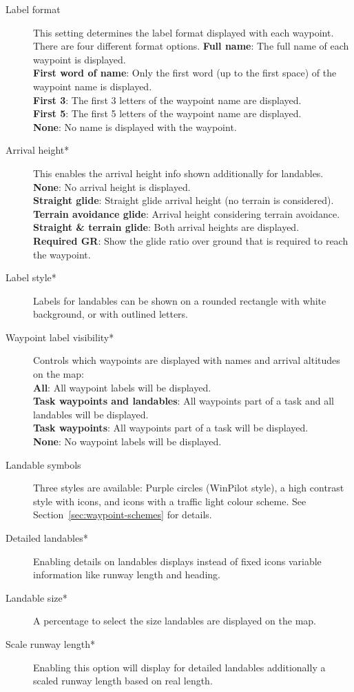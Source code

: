\begin{description}
\item[Label format]  This setting \label{conf:labels} determines the label format 
  displayed with each waypoint. There are four different format options.
  {\bf Full name}: The full name of each waypoint is displayed. \\
  {\bf First word of name}: Only the first word (up to the first space) of the 
  waypoint name is displayed. \\
  {\bf First 3}: The first 3 letters of the waypoint name are displayed. \\
  {\bf First 5}: The first 5 letters of the waypoint name are displayed. \\
  {\bf None}: No name is displayed with the waypoint.
\item[Arrival height*]  This enables the arrival height info shown additionally 
  for landables. \\
  {\bf None}: No arrival height is displayed. \\
  {\bf Straight glide}: Straight glide arrival height (no terrain is considered). \\
  {\bf Terrain avoidance glide}: Arrival height considering terrain avoidance. \\
  {\bf Straight \& terrain glide}: Both arrival heights are
  displayed. \\
  {\bf Required GR}: Show the glide ratio over ground that is
  required to reach the waypoint.
\item[Label style*]  Labels for landables can be shown on a rounded rectangle with 
  white background, or with outlined letters.
\item[Waypoint label visibility*]  \label{conf:labelvisibility} Controls which waypoints 
  are displayed with names and arrival altitudes on the map: \\
  {\bf All}: All waypoint labels will be displayed. \\
  {\bf Task waypoints and landables}: All waypoints part of a task and all landables 
  will be displayed. \\
  {\bf Task waypoints}: All waypoints part of a task will be displayed. \\
  {\bf None}:  No waypoint labels will be displayed.
\item[Landable symbols]  \label{conf:waypointicons} Three styles are available:
  Purple circles (WinPilot style), a high contrast style with icons,
  and icons with a traffic light colour scheme. See Section~\ref{sec:waypoint-schemes} for details.
\item[Detailed landables*]  Enabling details on landables displays instead of fixed icons 
  variable information like runway length and heading.
\item[Landable size*]  A percentage to select the size landables are displayed on the map.
\item[Scale runway length*]  Enabling this option will display for detailed landables 
  additionally a scaled runway length based on real length.
\end{description}


